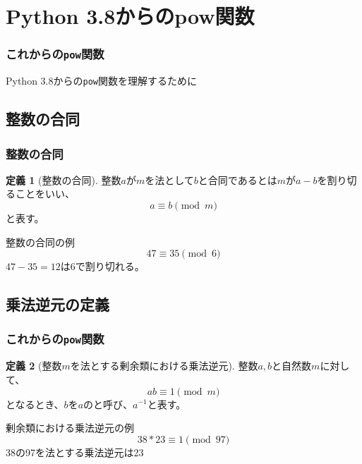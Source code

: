 \documentclass[aspectratio=169,dvipdfmx,14pt,notheorems]{beamer}
\theoremstyle{definition}
\newtheorem{definition}{定義}
\begin{document}
\section{Python 3.8からのpow関数}

\begin{frame}\frametitle{これからの\texttt{pow}関数}
\begin{center}
\Large Python 3.8からの\texttt{pow}関数を理解するために
\end{center}
\end{frame}

\subsection{整数の合同}

\begin{frame}\frametitle{整数の合同}

\begin{definition}[整数の合同]
整数$a$が$m$を法として$b$と合同であるとは$m$が$a-b$を割り切ることをいい、
\begin{equation*}
a \equiv b \pmod{m}
\end{equation*}
と表す。
\end{definition}

\begin{exampleblock}{整数の合同の例}
\begin{equation*}
47 \equiv 35 \pmod{6}
\end{equation*}
$47-35 = 12$は6で割り切れる。
\end{exampleblock}

\end{frame}

\subsection{乗法逆元の定義}

\begin{frame}\frametitle{これからの\texttt{pow}関数}

\begin{definition}[整数$m$を法とする剰余類における乗法逆元]
整数$a, b$と自然数$m$に対して、
\begin{equation*}
ab \equiv 1 \pmod{m}
\end{equation*}
となるとき、$b$を$a$のと呼び、$a^{-1}$と表す。
\end{definition}

\begin{exampleblock}{剰余類における乗法逆元の例}
\begin{equation*}
38 * 23 \equiv 1 \pmod{97}
\end{equation*}
38の97を法とする乗法逆元は23
\end{exampleblock}

\end{frame}
\end{document}
